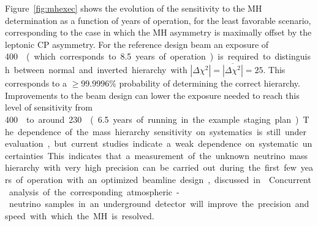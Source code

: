 Figure~\ref{fig:mhexec} shows the evolution of the sensitivity to the MH determination as a function
of years of operation, for the least favorable scenario, corresponding to the case in which the MH asymmetry is
maximally offset by the leptonic CP asymmetry. For the reference design beam an exposure of \SI{400}\ktMWyr{}  
(which corresponds to \num{8.5} years of operation) is required to distinguish
between normal and inverted hierarchy with $|\Delta \chi^2| =
\overline{|\Delta \chi^2|} = 25$.  This corresponds to a $\geq
99.9996\%$ probability of determining the correct hierarchy. 
Improvements to the beam design can
lower the exposure needed to reach this level of sensitivity from
\SI{400}\ktMWyr{} to around \SI{230}\ktMWyr{} (\num{6.5} years of
running in the example staging plan). The dependence of the mass
hierarchy sensitivity on systematics is still under evaluation, but
current studies indicate a weak dependence on systematic
uncertainties. This indicates that a measurement of the unknown
neutrino mass hierarchy with very high precision can be carried out
during the first few years of operation with an optimized beamline
design, discussed in \vollbnf. Concurrent analysis of the corresponding atmospheric-neutrino
samples in an underground detector will improve the precision and
speed with which the MH is resolved.


